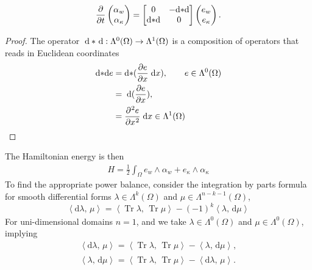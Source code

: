 \documentclass{article}
\DeclareMathOperator{\Tr}{Tr}
\newtheorem{proof}{Proof}
\newcommand{\inner}[3][]{\ensuremath{\left\langle #2, \, #3 \right\rangle_{#1}}}
\begin{document}
\begin{equation}\label{eq:pHsysEB_diff}
\diffp{}{t}\begin{pmatrix}
\alpha_w \\ \alpha_\kappa \\
\end{pmatrix} = \begin{bmatrix}
0 & -\mathrm{d}{*}\mathrm{d}\\
\mathrm{d}{*}\mathrm{d} & 0 \\
\end{bmatrix} \begin{pmatrix}
e_w \\ e_\kappa \\
\end{pmatrix}.
\end{equation}
\begin{proof}
	The operator $\d * \d : \Lambda^0(\Omega) \rightarrow \Lambda^1(\Omega)$ is a composition of operators that reads in Euclidean coordinates
	\begin{equation}
		\begin{aligned}
		\mathrm{d}{*}\mathrm{d} e &= \mathrm{d}{*} (\diffp{e}{x} \d{x}), \qquad e \in \Lambda^0(\Omega)\\
		         &= \d (\diffp{e}{x}), \\
		         &= \diffp[2]{e}{x} \d{x} \in \Lambda^1(\Omega) \\
		\end{aligned}
	\end{equation}
\end{proof}
The Hamiltonian energy is then 
\begin{equation}
\begin{aligned}
H = \frac{1}{2}  \int_{\Omega} e_w \wedge \alpha_w   + e_\kappa \wedge \alpha_\kappa
\end{aligned}
\end{equation}
To find the appropriate power balance, consider the integration by parts formula for smooth differential forms $\lambda \in \Lambda^k(\Omega)$ and $\mu \in \Lambda^{n-k-1}(\Omega)$,
\begin{equation}
	 \inner{\mathrm{d}{\lambda}}{\mu} = \inner{\Tr\lambda}{\Tr \mu} - (-1)^k \inner{\lambda}{\mathrm{d}\mu}
\end{equation}
For uni-dimensional domains $n=1$, and we take $\lambda \in \Lambda^0(\Omega)$ and $\mu \in \Lambda^{0}(\Omega)$, implying
\begin{equation}
\begin{aligned}
\inner{\mathrm{d}{\lambda}}{\mu} = \inner{\Tr\lambda}{\Tr \mu} - \inner{\lambda}{\mathrm{d}\mu}, \\
\inner{\lambda}{\mathrm{d}\mu} = \inner{\Tr\lambda}{\Tr \mu} - \inner{\mathrm{d}\lambda}{\mu}.
\end{aligned}
\end{equation}
\end{document}
